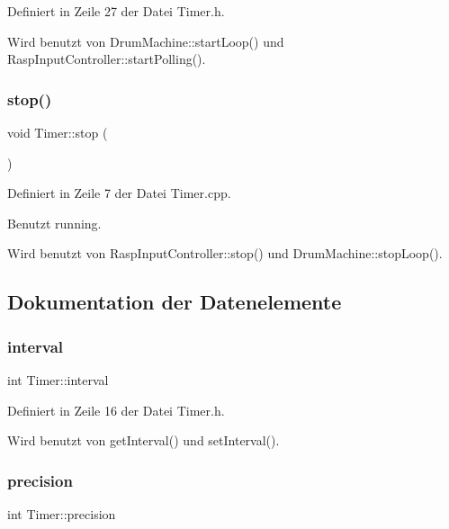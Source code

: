 Definiert in Zeile 27 der Datei Timer.\+h.



Wird benutzt von Drum\+Machine\+::start\+Loop() und Rasp\+Input\+Controller\+::start\+Polling().

\mbox{\label{class_timer_a63f0eb44b27402196590a03781515dba}} 
\subsubsection{\texorpdfstring{stop()}{stop()}}
{\footnotesize\ttfamily void Timer\+::stop (\begin{DoxyParamCaption}{ }\end{DoxyParamCaption})}



Definiert in Zeile 7 der Datei Timer.\+cpp.



Benutzt running.



Wird benutzt von Rasp\+Input\+Controller\+::stop() und Drum\+Machine\+::stop\+Loop().



\subsection{Dokumentation der Datenelemente}
\mbox{\label{class_timer_a8bdff3d549795a1efc0588edaa127b15}} 
\subsubsection{\texorpdfstring{interval}{interval}}
{\footnotesize\ttfamily int Timer\+::interval\hspace{0.3cm}{\ttfamily [private]}}



Definiert in Zeile 16 der Datei Timer.\+h.



Wird benutzt von get\+Interval() und set\+Interval().

\mbox{\label{class_timer_a71742840f2c6d4d6ab085b2eb439545a}} 
\subsubsection{\texorpdfstring{precision}{precision}}
{\footnotesize\ttfamily int Timer\+::precision\hspace{0.3cm}{\ttfamily [private]}}



